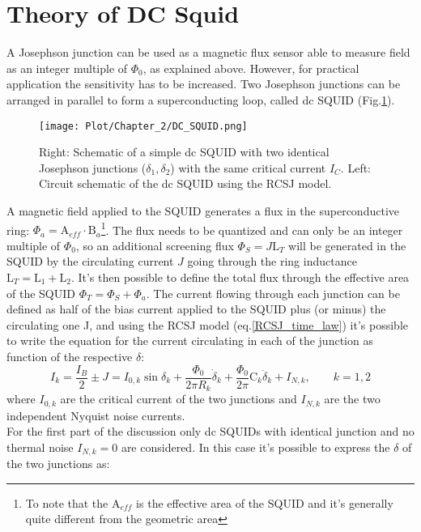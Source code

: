 \documentclass[12pt,a4paper]{report}
\begin{document}
    \section{Theory of DC Squid}
    A Josephson junction can be used as a magnetic flux sensor able to measure field as an integer multiple of $\Phi_0$, as explained above. However, for practical application the sensitivity has to be increased.
    Two Josephson junctions can be arranged in parallel to form a superconducting loop, called dc SQUID (Fig.\ref{dc_SQUID}).
    \begin{figure} [H]
    	\centering
    	\texttt{[image: Plot/Chapter\_2/DC\_SQUID.png]}
    	\caption{\small{Right: Schematic of a simple dc SQUID with two identical Josephson junctions ($\delta_1, \delta_2$) with the same critical current $I_C$. Left: Circuit schematic of the dc SQUID using the RCSJ model. }}
    	\label{dc_SQUID}
    \end{figure}
    A magnetic field applied to the SQUID generates a flux in the superconductive ring: $\Phi_a= \text{A}_{eff} \cdot \text{B}_a$\footnote{To note that the $\text{A}_{eff}$ is the effective area of the SQUID and it's generally quite different from the geometric area}. The flux needs to be quantized and can only be an integer multiple of $\Phi_0$, so an additional screening flux $\Phi_S=J\text{L}_T$ will be generated in the SQUID by the circulating current $J$ going through the ring inductance $\text{L}_T=\text{L}_1+\text{L}_2$. It's then possible to define the total flux through the effective area of the SQUID $\Phi_T = \Phi_S + \Phi_a$.
    The current flowing through each junction can be defined as half of the bias current applied to the SQUID plus (or minus) the circulating one J, and using the RCSJ model (eq.\ref{RCSJ_time_law}) it's possible to write the equation for the current circulating in each of the junction as function of the respective $\delta$:
    \begin{equation}
    	I_k=\frac{I_B}{2} \pm J = I_{0,k}\sin\delta_k + \frac{\Phi_0}{2\pi R_k}\dot{\delta}_k + \frac{\Phi_0}{2\pi} \text{C}_k\ddot{\delta}_k + I_{N,k}, \qquad k=1,2
    	 \label{Squid_system}
    \end{equation}
    where $I_{0,k}$ are the critical current of the two junctions and $ I_{N,k}$ are the two independent Nyquist noise currents.\\ For the first part of the discussion only dc SQUIDs with identical junction and no thermal noise  $ I_{N,k} = 0$ are considered. In this case it's possible to express the $\delta$ of the two junctions as:
\end{document}
